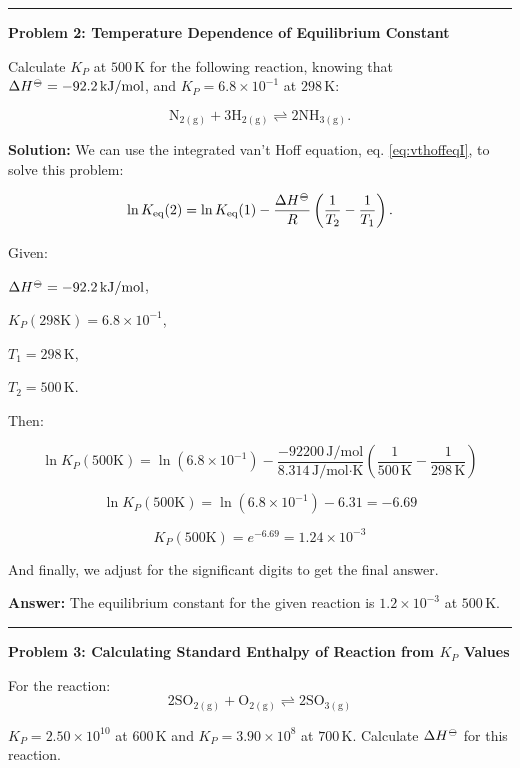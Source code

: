 \documentclass[
  9pt,
]{extbook}
\theoremstyle{definition}
\theoremstyle{definition}
\theoremstyle{definition}
\theoremstyle{definition}
\theoremstyle{remark}
\begin{document}
\begin{center}\rule{0.5\linewidth}{0.5pt}\end{center}

\textbf{Problem 2: Temperature Dependence of Equilibrium Constant}

Calculate \(K_P\) at \(500\,\text{K}\) for the following reaction, knowing that \(\Delta H^{{-\kern-6pt{\ominus}\kern-6pt-}} = -92.2\,\text{kJ/mol}\), and \(K_P = 6.8 \times 10^{-1}\) at \(298\,\text{K}\):

\[\text{N}_{2(\text{g})} + 3\text{H}_{2(\text{g})} \rightleftharpoons 2\text{NH}_{3(\text{g})}.\]

\textbf{Solution:} We can use the integrated van't Hoff equation, eq. \eqref{eq:vthoffeqI}, to solve this problem:

\[\ln K_{\text{eq}}(2) = \ln K_{\text{eq}}(1) - \frac{\Delta H^{-\kern-6pt{\ominus}\kern-6pt-}}{R} \left( \frac{1}{T_2}-\frac{1}{T_1} \right).\]

Given:

\(\Delta H^{{-\kern-6pt{\ominus}\kern-6pt-}} = -92.2\,\text{kJ/mol}\),

\(K_P (298 \text{K})= 6.8 \times 10^{-1}\),

\(T_1=298\,\text{K}\),

\(T_2=500\,\text{K}\).

Then:

\[\ln K_{P}(500\text{K}) = \ln \left(6.8 \times 10^{-1}\right) -\frac{-92200\,\text{J/mol}}{8.314\,\text{J/mol·K}}\left(\frac{1}{500\,\text{K}} - \frac{1}{298\,\text{K}}\right)\]

\[\ln K_{P}(500\text{K}) = \ln(6.8 \times 10^{-1}) - 6.31 = -6.69\]

\[K_{P}(500\text{K}) = e^{-6.69} = 1.24 \times 10^{-3}\]

And finally, we adjust for the significant digits to get the final answer.

\textbf{Answer:} The equilibrium constant for the given reaction is \(1.2 \times 10^{-3}\) at \(500\,\text{K}\).

\begin{center}\rule{0.5\linewidth}{0.5pt}\end{center}

\textbf{Problem 3: Calculating Standard Enthalpy of Reaction from \(K_P\) Values}

For the reaction:
\[2\text{SO}_{2(\text{g})} + \text{O}_{2(\text{g})} \rightleftharpoons 2\text{SO}_{3(\text{g})}\]

\(K_P = 2.50 \times 10^{10}\) at \(600\,\text{K}\) and \(K_P = 3.90 \times 10^8\) at \(700\,\text{K}\). Calculate \(\Delta H^{{-\kern-6pt{\ominus}\kern-6pt-}}\) for this reaction.
\end{document}
